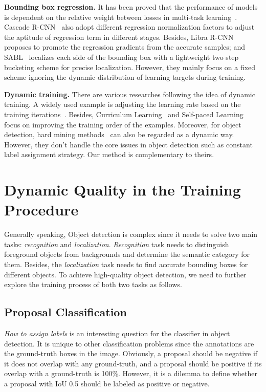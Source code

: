 \documentclass[runningheads]{llncs}
\begin{document}
\noindent
\textbf{Bounding box regression.}
It has been proved that the performance of models is dependent on the relative weight between losses in multi-task learning~\cite{Multi-task}. Cascade R-CNN~\cite{CascadeRCNN} also adopt different regression normalization factors to adjust the aptitude of regression term in different stages. Besides, Libra R-CNN~\cite{LibraRCNN} proposes to promote the regression gradients from the accurate samples; and SABL~\cite{SABL} localizes each side of the bounding box with a lightweight two step bucketing scheme for precise localization. However, they mainly focus on a fixed scheme ignoring the dynamic distribution of learning targets during training.

\noindent
\textbf{Dynamic training.}
There are various researches following the idea of dynamic training. A widely used example is adjusting the learning rate based on the training iterations~\cite{SGDR}. Besides, Curriculum Learning~\cite{Curriculum} and Self-paced Learning~\cite{Self-paced} focus on improving the training order of the examples. Moreover, for object detection, hard mining methods~\cite{OHEM,FocalLoss,LibraRCNN} can also be regarded as a dynamic way. However, they don't handle the core issues in object detection such as constant label assignment strategy. Our method is complementary to theirs.


\section{Dynamic Quality in the Training Procedure}

Generally speaking, Object detection is complex since it needs to solve two main tasks: \textit{recognition} and \textit{localization}. \textit{Recognition} task needs to distinguish foreground objects from backgrounds and determine the semantic category for them. Besides, the \textit{localization} task needs to find accurate bounding boxes for different objects. To achieve high-quality object detection, we need to further explore the training process of both two tasks as follows.


\subsection{Proposal Classification}
\label{sec:analysis_cls}

\emph{How to assign labels} is an interesting question for the classifier in object detection. It is unique to other classification problems since the annotations are the ground-truth boxes in the image. Obviously, a proposal should be negative if it does not overlap with any ground-truth, and a proposal should be positive if its overlap with a ground-truth is 100\%. However, it is a dilemma to define whether a proposal with IoU 0.5 should be labeled as positive or negative.
\end{document}
